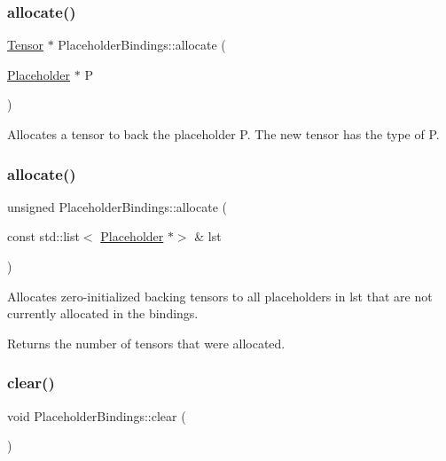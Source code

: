 \subsubsection{\texorpdfstring{allocate()}{allocate()}\hspace{0.1cm}{\footnotesize\ttfamily [1/2]}}
{\footnotesize\ttfamily \hyperlink{classglow_1_1_tensor}{Tensor} $\ast$ Placeholder\+Bindings\+::allocate (\begin{DoxyParamCaption}\item[{\hyperlink{classglow_1_1_placeholder}{Placeholder} $\ast$}]{P }\end{DoxyParamCaption})}

Allocates a tensor to back the placeholder {\ttfamily P}. The new tensor has the type of P. \mbox{\label{classglow_1_1_placeholder_bindings_a9786fe1975e69d07a06c326ba8d7b730}} 
\subsubsection{\texorpdfstring{allocate()}{allocate()}\hspace{0.1cm}{\footnotesize\ttfamily [2/2]}}
{\footnotesize\ttfamily unsigned Placeholder\+Bindings\+::allocate (\begin{DoxyParamCaption}\item[{const std\+::list$<$ \hyperlink{classglow_1_1_placeholder}{Placeholder} $\ast$$>$ \&}]{lst }\end{DoxyParamCaption})}

Allocates zero-\/initialized backing tensors to all placeholders in {\ttfamily lst} that are not currently allocated in the bindings. \begin{DoxyReturn}{Returns}
the number of tensors that were allocated. 
\end{DoxyReturn}
\mbox{\label{classglow_1_1_placeholder_bindings_a0cc0e5f3957e8372a34bf3de811e96bd}} 
\subsubsection{\texorpdfstring{clear()}{clear()}}
{\footnotesize\ttfamily void Placeholder\+Bindings\+::clear (\begin{DoxyParamCaption}{ }\end{DoxyParamCaption})}

